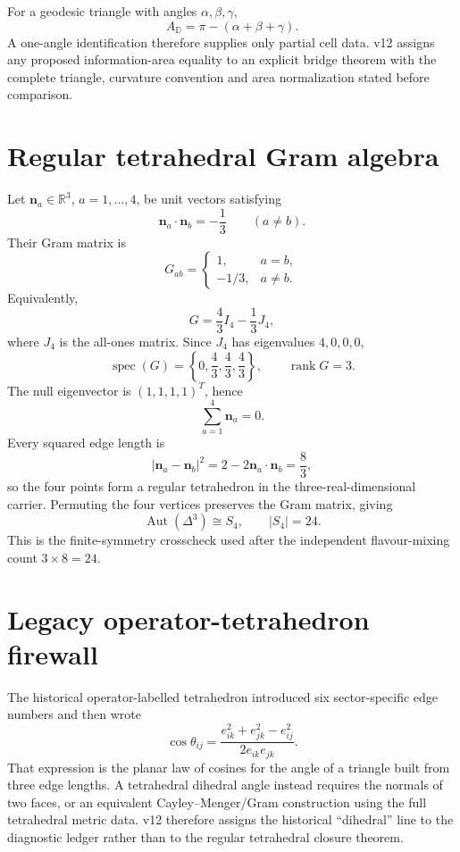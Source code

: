 For a geodesic triangle with angles \(\alpha,\beta,\gamma\),
\[
A_{\mathbb D}=\pi-(\alpha+\beta+\gamma).
\]
A one-angle identification therefore supplies only partial cell data.  v12
assigns any proposed information-area equality to an explicit bridge theorem
with the complete triangle, curvature convention and area normalization stated
before comparison.

\section{Regular tetrahedral Gram algebra}

Let \(\mathbf n_a\in\mathbb R^3\), \(a=1,\ldots,4\), be unit vectors satisfying
\[
\mathbf n_a\cdot\mathbf n_b=-\frac13\qquad(a\ne b).
\]
Their Gram matrix is
\[
G_{ab}=
\begin{cases}
1,&a=b,\\
-1/3,&a\ne b.
\end{cases}
\]
Equivalently,
\[
G=\frac43I_4-\frac13J_4,
\]
where \(J_4\) is the all-ones matrix.  Since \(J_4\) has eigenvalues \(4,0,0,0\),
\[
\operatorname{spec}(G)=\left\{0,\frac43,\frac43,\frac43\right\},
\qquad
\operatorname{rank}G=3.
\]
The null eigenvector is \((1,1,1,1)^T\), hence
\[
\sum_{a=1}^4\mathbf n_a=0.
\]
Every squared edge length is
\[
|\mathbf n_a-\mathbf n_b|^2
=2-2\mathbf n_a\cdot\mathbf n_b
=\frac83,
\]
so the four points form a regular tetrahedron in the three-real-dimensional
carrier.  Permuting the four vertices preserves the Gram matrix, giving
\[
\operatorname{Aut}(\Delta^3)\cong S_4,
\qquad |S_4|=24.
\]
This is the finite-symmetry crosscheck used after the independent
flavour-mixing count \(3\times8=24\).

\section{Legacy operator-tetrahedron firewall}

The historical operator-labelled tetrahedron introduced six sector-specific
edge numbers and then wrote
\[
\cos\theta_{ij}
=
\frac{e_{ik}^2+e_{jk}^2-e_{ij}^2}{2e_{ik}e_{jk}}.
\]
That expression is the planar law of cosines for the angle of a triangle built
from three edge lengths.  A tetrahedral dihedral angle instead requires the
normals of two faces, or an equivalent Cayley--Menger/Gram construction using
the full tetrahedral metric data.  v12 therefore assigns the historical
``dihedral'' line to the diagnostic ledger rather than to the regular
tetrahedral closure theorem.

